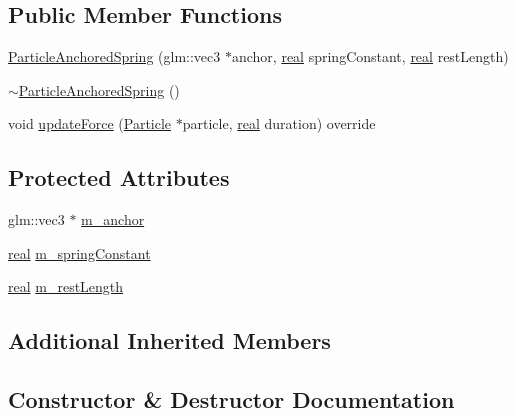 \subsection*{Public Member Functions}
\begin{DoxyCompactItemize}
\item 
\mbox{\hyperlink{classrum_1_1_particle_anchored_spring_af0057780e9cc36a2c3e80d5d2ced533b}{Particle\+Anchored\+Spring}} (glm\+::vec3 $\ast$anchor, \mbox{\hyperlink{namespacerum_a7e8cca23573d5eaead0f138cbaa4862c}{real}} spring\+Constant, \mbox{\hyperlink{namespacerum_a7e8cca23573d5eaead0f138cbaa4862c}{real}} rest\+Length)
\item 
\mbox{\hyperlink{classrum_1_1_particle_anchored_spring_a590f7f2dbb306ba4ac5cb7963c8dbf22}{$\sim$\+Particle\+Anchored\+Spring}} ()
\item 
void \mbox{\hyperlink{classrum_1_1_particle_anchored_spring_a42d866fc67afce8a939640f9a9110637}{update\+Force}} (\mbox{\hyperlink{classrum_1_1_particle}{Particle}} $\ast$particle, \mbox{\hyperlink{namespacerum_a7e8cca23573d5eaead0f138cbaa4862c}{real}} duration) override
\end{DoxyCompactItemize}
\subsection*{Protected Attributes}
\begin{DoxyCompactItemize}
\item 
glm\+::vec3 $\ast$ \mbox{\hyperlink{classrum_1_1_particle_anchored_spring_a33813234e4924860ce0f5ee29efd5c96}{m\+\_\+anchor}}
\item 
\mbox{\hyperlink{namespacerum_a7e8cca23573d5eaead0f138cbaa4862c}{real}} \mbox{\hyperlink{classrum_1_1_particle_anchored_spring_a1f5b5cc0af0815b1d7d9902c515f9ed8}{m\+\_\+spring\+Constant}}
\item 
\mbox{\hyperlink{namespacerum_a7e8cca23573d5eaead0f138cbaa4862c}{real}} \mbox{\hyperlink{classrum_1_1_particle_anchored_spring_ae0b4ab273dfd453b9e871ec1371d8ab8}{m\+\_\+rest\+Length}}
\end{DoxyCompactItemize}
\subsection*{Additional Inherited Members}


\subsection{Constructor \& Destructor Documentation}
\mbox{\label{classrum_1_1_particle_anchored_spring_af0057780e9cc36a2c3e80d5d2ced533b}} 
